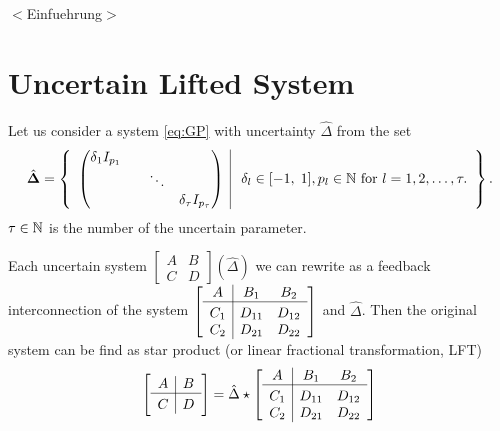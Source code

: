 %





{\color{red}$<$Einfuehrung$>$}


\section{Uncertain Lifted System} 

Let us consider a system \eqref{eq:GP} with uncertainty $\hat{\Delta} $ from the set 
\begin{align}
\label{eq:Delta_hat_set}
\hat{\mathbf{\Delta}} =
\left\{\begin{array}{c|c}
\begin{pmatrix}
\delta_1 I_{p_1} & & &\\
& & \ddots &\\
& & &\delta_\tau I_{p_\tau}
\end{pmatrix} & \; \delta_l \in [-1,\;1], p_l \in {\mathbb{N}} \text{ for } l = 1, 2, \dots , \tau .
\end{array} \right\}.
\end{align}
$\tau \in {\mathbb{N}}$ is the number of the uncertain parameter.

Each uncertain system $\left[\begin{array}{c|c}
A & B \\\hline C &D
\end{array}\right]\left(\hat{\Delta}\right)$
we can rewrite as a feedback interconnection of the system 
$
\left[\begin{array}{c|c c}
A & B_1 & B_2 \\\hline
C_1 & D_{11} & D_{12} \\
C_2 & D_{21} & D_{22}
\end{array}\right]
$
and $\hat{\Delta}$. 
Then the original system can be find as star product (or linear fractional transformation, LFT)
\begin{align}
\left[\begin{array}{c|c}
A & B \\\hline C &D
\end{array}\right] = \hat{\Delta} \star \left[\begin{array}{c|c c}
A & B_1 & B_2 \\\hline
C_1 & D_{11} & D_{12} \\
C_2 & D_{21} & D_{22}	
\end{array}\right]
\end{align}

